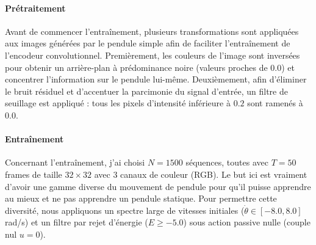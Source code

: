 \documentclass[11pt]{article}
\begin{document}
\paragraph{Prétraitement}
Avant de commencer l'entraînement, plusieurs transformations sont appliquées aux images générées par le pendule simple afin de faciliter l'entraînement de l'encodeur convolutionnel. Premièrement, les couleurs de l'image sont inversées pour obtenir un arrière-plan à prédominance noire (valeurs proches de $0.0$) et concentrer l'information sur le pendule lui-même. Deuxièmement, afin d'éliminer le bruit résiduel et d'accentuer la parcimonie du signal d'entrée, un filtre de seuillage est appliqué : tous les pixels d'intensité inférieure à $0.2$ sont ramenés à $0.0$.

\paragraph{Entraînement}
Concernant l'entraînement, j'ai choisi $N = 1500$ séquences, toutes avec $T = 50$ frames de taille $32 \times 32$ avec $3$ canaux de couleur (RGB). Le but ici est vraiment d'avoir une gamme diverse du mouvement de pendule pour qu'il puisse apprendre au mieux et ne pas apprendre un pendule statique. Pour permettre cette diversité, nous appliquons un spectre large de vitesses initiales ($\dot{\theta} \in [-8.0, 8.0]$ rad/s) et un filtre par rejet d'énergie ($E \ge -5.0$) sous action passive nulle (couple nul $u=0$).

%
\end{document}
